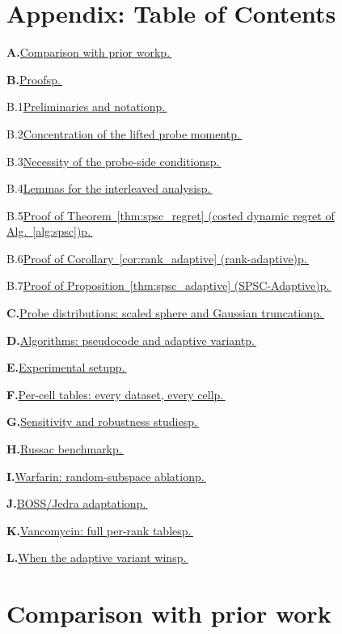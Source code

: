 \documentclass{article}
\begin{document}
\section*{Appendix: Table of Contents}
\label{app:toc}

\begingroup
\hypersetup{linkcolor=blue}

\newcommand{\tocentry}[3]{%
  \noindent\textbf{#1.}\;\hyperref[#2]{#3}\dotfill\hyperref[#2]{p.\,\pageref*{#2}}\par\vspace{2pt}%
}
\newcommand{\tocsubentry}[3]{%
  \noindent\hspace{1.2em}#1\;\hyperref[#2]{#3}\dotfill\hyperref[#2]{p.\,\pageref*{#2}}\par\vspace{1pt}%
}

\tocentry{A}{app:related_table}{Comparison with prior work}
\tocentry{B}{app:proofs}{Proofs}
  \tocsubentry{B.1}{app:prelim}{Preliminaries and notation}
  \tocsubentry{B.2}{app:concentration_proof}{Concentration of the lifted probe moment}
  \tocsubentry{B.3}{app:necessity}{Necessity of the probe-side conditions}
  \tocsubentry{B.4}{app:proof_main_lemmas}{Lemmas for the interleaved analysis}
  \tocsubentry{B.5}{app:proof_main}{Proof of Theorem~\ref{thm:spsc_regret} (costed dynamic regret of Alg.~\ref{alg:spsc})}
  \tocsubentry{B.6}{app:proof_adaptive_rank}{Proof of Corollary~\ref{cor:rank_adaptive} (rank-adaptive)}
  \tocsubentry{B.7}{app:proof_adaptive}{Proof of Proposition~\ref{thm:spsc_adaptive} (SPSC-Adaptive)}
\tocentry{C}{app:truncation}{Probe distributions: scaled sphere and Gaussian truncation}
\tocentry{D}{app:algorithms}{Algorithms: pseudocode and adaptive variant}
\tocentry{E}{app:setup}{Experimental setup}
\tocentry{F}{app:percell}{Per-cell tables: every dataset, every cell}
\tocentry{G}{app:sensitivity}{Sensitivity and robustness studies}
\tocentry{H}{app:sota_compare}{Russac benchmark}
\tocentry{I}{app:warfarin_ablation}{Warfarin: random-subspace ablation}
\tocentry{J}{app:boss_jedra_detail}{BOSS/Jedra adaptation}
\tocentry{K}{app:vancomycin_full}{Vancomycin: full per-rank tables}
\tocentry{L}{app:adaptive_winner}{When the adaptive variant wins}

\endgroup

\section{Comparison with prior work}
\label{app:related_table}
\end{document}

